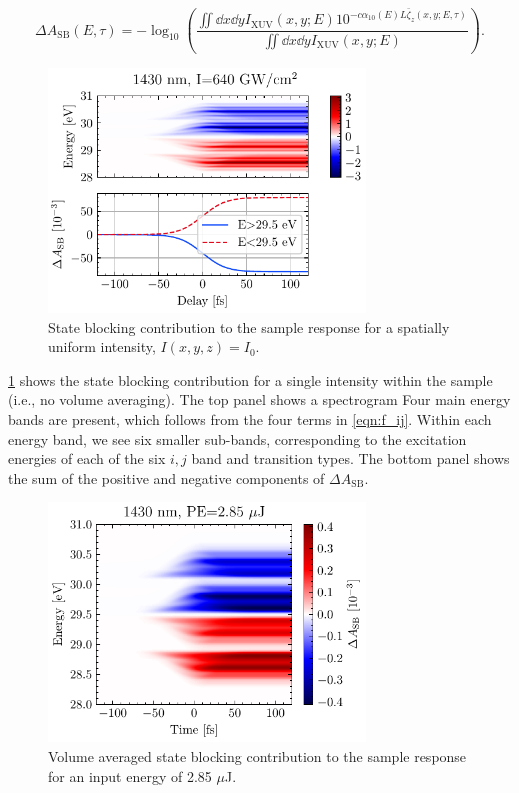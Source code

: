 \begin{equation}
\Delta A_{\textrm{SB}} (E, \tau) = -\log_{10} \left( \frac{ \iint \dd{x} \dd{y} I_{\textrm{XUV}}(x,y;E) 10^{- c \alpha_{10}(E) L \bar{\zeta}_z(x,y;E,\tau)}}{ \iint \dd{x} \dd{y} I_{\textrm{XUV}}(x,y;E)} \right).
\end{equation}

\begin{figure}
	\centering
	\includegraphics[width=0.75\textwidth]{figures/chap4/dA_SB_1430nm_640GWcm2.pdf}
	\caption{State blocking contribution to the sample response for a spatially uniform intensity, $I(x,y,z)=I_0$.}
	\label{fig:dA_SB_1430nm_640GWcm2}
\end{figure}

\cref{fig:dA_SB_1430nm_640GWcm2} shows the state blocking contribution for a single intensity within the sample (i.e., no volume averaging). The top panel shows a spectrogram Four main energy bands are present, which follows from the four terms in \cref{eqn:f_ij}. Within each energy band, we see six smaller sub-bands, corresponding to the excitation energies of each of the six $i,j$ band and transition types. The bottom panel shows the sum of the positive and negative components of $\Delta A_{\textrm{SB}}$.

\begin{figure}
	\centering
	\includegraphics[width=0.75\textwidth]{figures/chap4/dA_SB_calc_1430nm_2.85uJ.pdf}
	\caption{Volume averaged state blocking contribution to the sample response for an input energy of 2.85 $\mu$J.}
	\label{fig:dA_SB_calc_1430nm_2.85uJ}
\end{figure}

